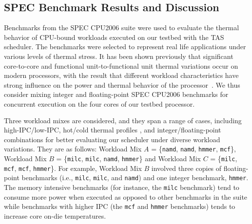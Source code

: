 \documentclass[times, 10pt,twocolumn]{IEEEtran}
\begin{document}
\subsection{SPEC Benchmark Results and Discussion}
\label{sec:microarch} 
Benchmarks from the SPEC CPU2006 suite \cite{Henning2006} were used to
evaluate the thermal behavior of CPU-bound workloads executed on our
testbed with the TAS scheduler.  The benchmarks were selected to
represent real life applications under various levels of thermal
stress. It has been shown previously \cite{Choi2007,Cher2011} that
significant core-to-core and functional unit-to-functional unit thermal
variations occur on modern processors, with the result that different
workload characteristics have strong influence on the power and thermal
behavior of the processor~\cite{Jimenez2010}.  We thus consider mixing
integer and floating-point SPEC CPU2006 benchmarks for concurrent
execution on the four cores of our testbed processor.

Three workload mixes are considered, and they span a range of cases,
including high-IPC/low-IPC, hot/cold thermal profiles \cite{Kursun2008},
and integer/floating-point combinations for better evaluating our
scheduler under diverse workload variations.  They are as follows:
Workload Mix $A$ = \{\texttt{namd}, \texttt{namd}, \texttt{hmmer},
\texttt{mcf}\}, Workload Mix $B$ = \{\texttt{milc}, \texttt{milc},
\texttt{namd}, \texttt{hmmer}\} and Workload Mix $C$ = \{\texttt{milc},
\texttt{mcf}, \texttt{mcf}, \texttt{hmmer}\}.  For example, Workload Mix
$B$ involved three copies of floating-point benchmarks (i.e.,
\texttt{milc}, \texttt{milc}, and \texttt{namd}) and one integer
benchmark, \texttt{hmmer}.  The memory intensive benchmarks (for
instance, the \texttt{milc} benchmark) tend to consume more power when
executed as opposed to other benchmarks in the suite while benchmarks
with higher IPC (the \texttt{mcf} and \texttt{hmmer} benchmarks) tends
to increase core on-die temperatures.
\end{document}
